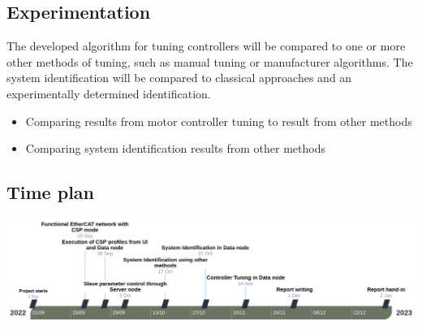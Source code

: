 \subsection{Experimentation}

The developed algorithm for tuning controllers will be compared to one or more other methods of tuning, such as manual tuning or manufacturer algorithms.
The system identification will be compared to classical approaches and an experimentally determined identification. 

\begin{itemize}
	\setlength\itemsep{\pdescitemsep}
	\item Comparing results from motor controller tuning to result from other methods
	\item Comparing system identification results from other methods
\end{itemize}

\subsection{Time plan}

\begin{center}
	\includegraphics[width=\textwidth]{../resources/initial-description-timeline.png}
\end{center}

